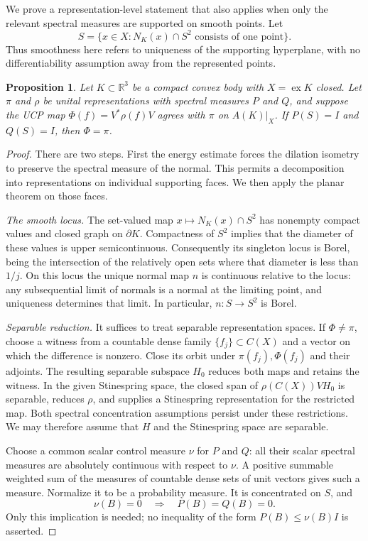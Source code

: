 \documentclass[11pt,letterpaper]{amsart}
\newtheorem{proposition}[theorem]{Proposition}
\theoremstyle{definition}
\theoremstyle{remark}
\numberwithin{equation}{section}
\DeclareMathOperator{\ex}{ex}
\begin{document}
We prove a representation-level statement that also applies
when only the relevant spectral measures are supported on
smooth points. Let
\[
 S=\{x\in X:N_K(x)\cap S^2\text{ consists of one point}\}.
\]
Thus smoothness here refers to uniqueness of the supporting
hyperplane, with no differentiability assumption away from
the represented points.

\begin{proposition}\label{lb:prop:smooth-both}
Let $K\subset\mathbb R^3$ be a compact convex body with
$X=\ex K$ closed. Let $\pi$ and $\rho$ be unital
representations with spectral measures $P$ and $Q$, and
suppose the UCP map $\Phi(f)=V^*\rho(f)V$ agrees with
$\pi$ on $A(K)|_X$. If $P(S)=I$ and $Q(S)=I$, then
$\Phi=\pi$.
\end{proposition}
\begin{proof}
There are two steps. First the energy estimate forces the dilation
isometry to preserve the spectral measure of the normal. This permits
a decomposition into representations on individual supporting faces.
We then apply the planar theorem on those faces.

\emph{The smooth locus.}
The set-valued map $x\mapsto N_K(x)\cap S^2$ has nonempty
compact values and closed graph on $\partial K$. Compactness
of $S^2$ implies that the diameter of these values is upper
semicontinuous. Consequently its singleton locus is Borel,
being the intersection of the relatively open sets where
that diameter is less than $1/j$. On this locus the unique
normal map $n$ is continuous relative to the locus: any
subsequential limit of normals is a normal at the limiting
point, and uniqueness determines that limit. In particular,
$n:S\to S^2$ is Borel.

\emph{Separable reduction.}
It suffices to treat separable representation spaces. If
$\Phi\ne\pi$, choose a witness from a countable dense family
$\{f_j\}\subset C(X)$ and a vector on which the difference
is nonzero. Close its orbit under $\pi(f_j),\Phi(f_j)$ and
their adjoints. The resulting separable subspace $H_0$
reduces both maps and retains the witness. In the given
Stinespring space, the closed span of
$\rho(C(X))VH_0$ is separable, reduces $\rho$, and supplies
a Stinespring representation for the restricted map.
Both spectral concentration assumptions persist under these
restrictions. We may therefore assume that $H$ and the
Stinespring space are separable.

Choose a common scalar control measure $\nu$ for $P$ and $Q$:
all their scalar spectral measures are absolutely continuous with
respect to $\nu$. A positive summable weighted sum of the measures of
countable dense sets of unit vectors gives such a measure. Normalize
it to be a probability measure. It is concentrated on $S$, and
\[
 \nu(B)=0\quad\Longrightarrow\quad P(B)=Q(B)=0.
\]
Only this implication is needed; no inequality of the form
$P(B)\le\nu(B)I$ is asserted.


\end{proof}
\end{document}
